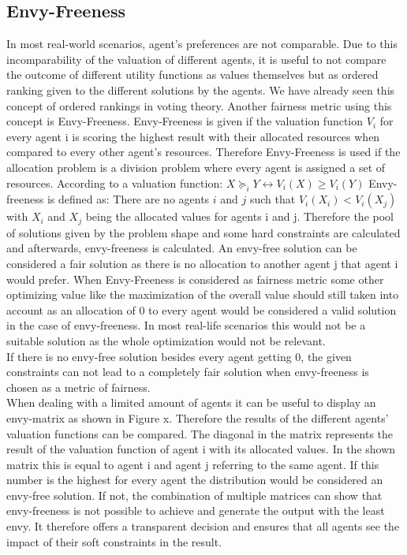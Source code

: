 \documentclass[german, a4paper, 11pt, oneside]{scrbook}
\begin{document}
\subsection{Envy-Freeness}
In most real-world scenarios, agent's preferences are not comparable.
Due to this incomparability of the valuation of different agents, it is useful to not compare the outcome of different utility functions as values themselves but as ordered ranking given to the different solutions by the agents. We have already seen this concept of ordered rankings in voting theory. Another fairness metric using this concept is Envy-Freeness. Envy-Freeness is given if the valuation function $V_i$ for every agent i is scoring the highest result with their allocated resources when compared to every other agent's resources. Therefore Envy-Freeness is used if the allocation problem is a division problem where every agent is assigned a set of resources.
According to a valuation function:
$X \succeq_i Y \leftrightarrow V_i(X) \geq V_i(Y)$
Envy-freeness is defined as: There are no agents $i$ and $j$ such that
$V_i(X_i) < V_i(X_j)$
with $X_i$ and $X_j$ being the allocated values for agents i and j.
Therefore the pool of solutions given by the problem shape and some hard constraints are calculated and afterwards, envy-freeness is calculated. An envy-free solution can be considered a fair solution as there is no allocation to another agent j that agent i would prefer. \cite{.2022,FelixBrandtVincentConitzerUlleEndrissJeromeLangandArielD.Procaccia.} When Envy-Freeness is considered as fairness metric some other optimizing value like the maximization of the overall value should still taken into account as an allocation of 0 to every agent would be considered a valid solution in the case of envy-freeness. \cite{Bouveret.11222023} In most real-life scenarios this would not be a suitable solution as the whole optimization would not be relevant.
\\If there is no envy-free solution besides every agent getting 0, the given constraints can not lead to a completely fair solution when envy-freeness is chosen as a metric of fairness. \\When dealing with a limited amount of agents it can be useful to display an envy-matrix as shown in Figure x. Therefore the results of the different agents' valuation functions can be compared. The diagonal in the matrix represents the result of the valuation function of agent i with its allocated values. In the shown matrix this is equal to agent i and agent j referring to the same agent. If this number is the highest for every agent the distribution would be considered an envy-free solution. If not, the combination of multiple matrices can show that envy-freeness is not possible to achieve and generate the output with the least envy. It therefore offers a transparent decision and ensures that all agents see the impact of their soft constraints in the result.\\ 
\end{document}
